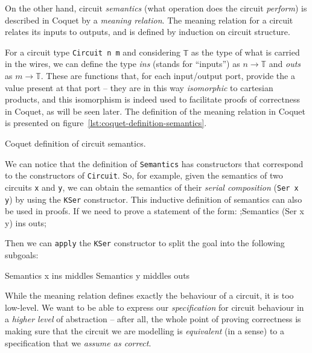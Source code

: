 \documentclass[a4paper]{article}
\begin{document}
                On the other hand, circuit \emph{semantics} (what operation does the circuit
                \emph{perform}) is described in Coquet by a \emph{meaning relation}. The meaning
                relation for a circuit relates its inputs to outputs, and is defined by induction on
                circuit structure.

                For a circuit type \texttt{Circuit n m} and considering \texttt{𝕋} as the type of
                what is carried in the wires, we can define the type \emph{ins} (stands for
                ``inputs'') as $n \rightarrow 𝕋$ and \emph{outs} as $m \rightarrow 𝕋$. These are
                functions that, for each input/output port, provide the a value present at that port
                -- they are in this way \emph{isomorphic} to cartesian products, and this isomorphism
                is indeed used to facilitate proofs of correctness in Coquet, as will be seen later.
                The definition of the meaning relation in Coquet is presented on
                figure~\ref{lst:coquet-definition-semantics}.

                \begin{listing}[h!]
                    \caption{Coquet definition of circuit semantics.
                        \label{lst:coquet-definition-semantics}}
                \end{listing}

                We can notice that the definition of \texttt{Semantics} has constructors that
                correspond to the constructors of \texttt{Circuit}. So, for example, given the
                semantics of two circuits \texttt{x} and \texttt{y}, we can obtain the semantics of
                their \emph{serial composition} (\texttt{Ser x y}) by using the \texttt{KSer}
                constructor. This inductive definition of semantics can also be used in proofs. If
                we need to prove a statement of the form:
                \coq;Semantics (Ser x y) ins outs;

                Then we can \texttt{apply} the \texttt{KSer} constructor to split the goal into the
                following subgoals:

                \begin{coqcode}
        Semantics x ins middles
        Semantics y middles outs
                \end{coqcode}

                While the meaning relation defines exactly the behaviour of a circuit, it is too
                low-level. We want to be able to express our \emph{specification} for circuit
                behaviour in a \emph{higher level} of abstraction -- after all, the whole point of
                proving correctness is making sure that the circuit we are modelling is
                \emph{equivalent} (in a sense) to a specification that we \emph{assume as correct}.
\end{document}
